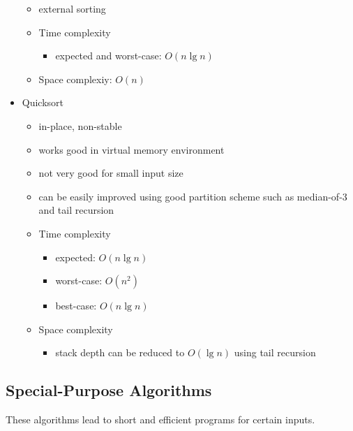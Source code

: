 \documentclass[12pt]{article}
\begin{document}
\begin{itemize}
\begin{itemize}
            \item external sorting
            \item Time complexity
                \begin{itemize}
                    \item expected and worst-case: $O(n\lg n)$
                \end{itemize}
            \item Space complexiy: $O(n)$
        \end{itemize}
    \item Quicksort
        \begin{itemize}
            \item in-place, non-stable
            \item works good in virtual memory environment
            \item not very good for small input size
            \item can be easily improved using good partition scheme such as
                  median-of-3 and tail recursion
            \item Time complexity
                \begin{itemize}
                    \item expected: $O(n\lg n)$
                    \item worst-case: $O(n^2)$
                    \item best-case: $O(n\lg n)$
                \end{itemize}
            \item Space complexity
                \begin{itemize}
                    \item stack depth can be reduced to $O(\lg n)$ using tail
                          recursion
                \end{itemize}
        \end{itemize}
\end{itemize}

\subsection{Special-Purpose Algorithms}
These algorithms lead to short and efficient programs for certain inputs.
\end{document}
